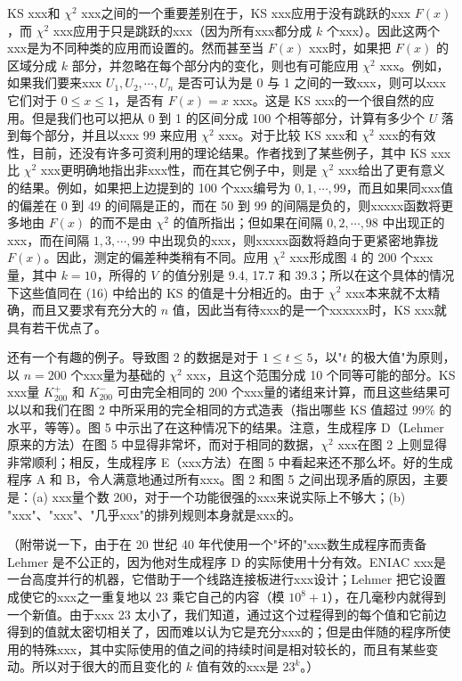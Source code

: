 KS xxx和 $\chi^2$ xxx之间的一个重要差别在于，KS xxx应用于没有跳跃的xxx $F(x)$，而 $\chi^2$ xxx应用于只是跳跃的xxx（因为所有xxx都分成 $k$ 个xxx）。因此这两个xxx是为不同种类的应用而设置的。然而甚至当 $F(x)$ xxx时，如果把 $F(x)$ 的区域分成 $k$ 部分，并忽略在每个部分内的变化，则也有可能应用 $\chi^2$ xxx。例如，如果我们要来xxx $U_1, U_2, \cdots, U_n$ 是否可认为是 0 与 1 之间的一致xxx，则可以xxx它们对于 $0 \leqslant x \leqslant 1$，是否有 $F(x) = x$ xxx。这是 KS xxx的一个很自然的应用。但是我们也可以把从 0 到 1 的区间分成 100 个相等部分，计算有多少个 $U$ 落到每个部分，并且以xxx 99 来应用 $\chi^2$ xxx。对于比较 KS xxx和 $\chi^2$ xxx的有效性，目前，还没有许多可资利用的理论结果。作者找到了某些例子，其中 KS xxx比 $\chi^2$ xxx更明确地指出非xxx性，而在其它例子中，则是 $\chi^2$ xxx给出了更有意义的结果。例如，如果把上边提到的 100 个xxx编号为 $0, 1, \cdots, 99$，而且如果同xxx值的偏差在 0 到 49 的间隔是正的，而在 50 到 99 的间隔是负的，则xxxxx函数将更多地由 $F(x)$ 的而不是由 $\chi^2$ 的值所指出；但如果在间隔 $0, 2, \cdots, 98$ 中出现正的xxx，而在间隔 $1, 3, \cdots, 99$ 中出现负的xxx，则xxxxx函数将趋向于更紧密地靠拢 $F(x)$。因此，测定的偏差种类稍有不同。应用 $\chi^2$ xxx形成图 4 的 200 个xxx量，其中 $k = 10$，所得的 $V$ 的值分别是 9.4, 17.7 和 39.3；所以在这个具体的情况下这些值同在 (16) 中给出的 KS 的值是十分相近的。由于 $\chi^2$ xxx本来就不太精确，而且又要求有充分大的 $n$ 值，因此当有待xxx的是一个xxxxxx时，KS xxx就具有若干优点了。

还有一个有趣的例子。导致图 2 的数据是对于 $1 \leqslant t \leqslant 5$，以"$t$ 的极大值"为原则，以 $n = 200$ 个xxx量为基础的 $\chi^2$ xxx，且这个范围分成 10 个同等可能的部分。KS xxx量 $K_{200}^+$ 和 $K_{200}^-$ 可由完全相同的 200 个xxx量的诸组来计算，而且这些结果可以以和我们在图 2 中所采用的完全相同的方式造表（指出哪些 KS 值超过 99\% 的水平，等等）。图 5 中示出了在这种情况下的结果。注意，生成程序 D（Lehmer 原来的方法）在图 5 中显得非常坏，而对于相同的数据，$\chi^2$ xxx在图 2 上则显得非常顺利；相反，生成程序 E（xxx方法）在图 5 中看起来还不那么坏。好的生成程序 A 和 B，令人满意地通过所有xxx。图 2 和图 5 之间出现矛盾的原因，主要是：(a) xxx量个数 200，对于一个功能很强的xxx来说实际上不够大；(b) "xxx"、"xxx"、"几乎xxx"的排列规则本身就是xxx的。

（附带说一下，由于在 20 世纪 40 年代使用一个"坏的"xxx数生成程序而责备 Lehmer 是不公正的，因为他对生成程序 D 的实际使用十分有效。ENIAC xxx是一台高度并行的机器，它借助于一个线路连接板进行xxx设计；Lehmer 把它设置成使它的xxx之一重复地以 23 乘它自己的内容（模 $10^8 + 1$），在几毫秒内就得到一个新值。由于xxx 23 太小了，我们知道，通过这个过程得到的每个值和它前边得到的值就太密切相关了，因而难以认为它是充分xxx的；但是由伴随的程序所使用的特殊xxx，其中实际使用的值之间的持续时间是相对较长的，而且有某些变动。所以对于很大的而且变化的 $k$ 值有效的xxx是 $23^k$。）

